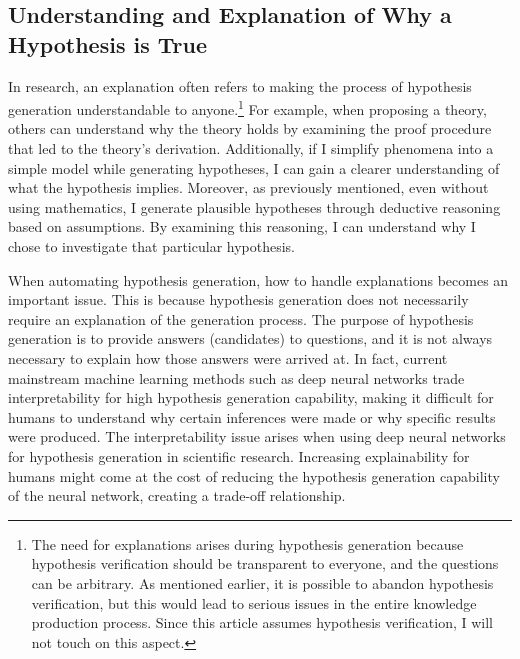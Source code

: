 \documentclass{article}
\begin{document}


\subsection{Understanding and Explanation of Why a Hypothesis is True}
In research, an explanation often refers to making the process of hypothesis generation understandable to anyone.\footnote{
The need for explanations arises during hypothesis generation because hypothesis verification should be transparent to everyone, and the questions can be arbitrary. As mentioned earlier, it is possible to abandon hypothesis verification, but this would lead to serious issues in the entire knowledge production process. Since this article assumes hypothesis verification, I will not touch on this aspect.
} For example, when proposing a theory, others can understand why the theory holds by examining the proof procedure that led to the theory's derivation. Additionally, if I simplify phenomena into a simple model while generating hypotheses, I can gain a clearer understanding of what the hypothesis implies. Moreover, as previously mentioned, even without using mathematics, I generate plausible hypotheses through deductive reasoning based on assumptions. By examining this reasoning, I can understand why I chose to investigate that particular hypothesis.

When automating hypothesis generation, how to handle explanations becomes an important issue. This is because hypothesis generation does not necessarily require an explanation of the generation process. The purpose of hypothesis generation is to provide answers (candidates) to questions, and it is not always necessary to explain how those answers were arrived at. In fact, current mainstream machine learning methods such as deep neural networks trade interpretability for high hypothesis generation capability, making it difficult for humans to understand why certain inferences were made or why specific results were produced. The interpretability issue arises when using deep neural networks for hypothesis generation in scientific research. Increasing explainability for humans might come at the cost of reducing the hypothesis generation capability of the neural network, creating a trade-off relationship.
\end{document}
